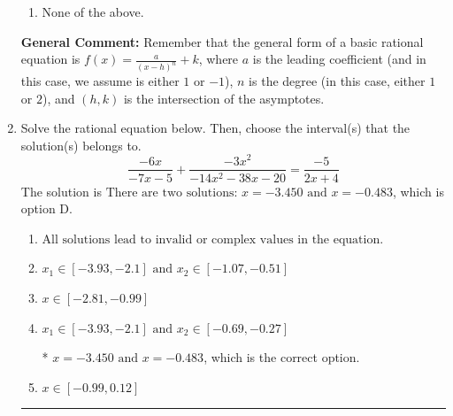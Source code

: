 \documentclass{extbook}[14pt]
\newcommand{\litem}[1]{\item #1

\rule{\textwidth}{0.4pt}}
\begin{document}
\begin{enumerate}
{\begin{enumerate}[label=\Alph*.]
\item None of the above.\end{enumerate}
\textbf{General Comment:} Remember that the general form of a basic rational equation is $ f(x) = \frac{a}{(x-h)^n} + k$, where $a$ is the leading coefficient (and in this case, we assume is either $1$ or $-1$), $n$ is the degree (in this case, either $1$ or $2$), and $(h, k)$ is the intersection of the asymptotes.
}
\litem{
Solve the rational equation below. Then, choose the interval(s) that the solution(s) belongs to.
\[ \frac{-6x}{-7x -5} + \frac{-3x^{2}}{-14x^{2} -38 x -20} = \frac{-5}{2x + 4} \]The solution is \( \text{There are two solutions: } x = -3.450 \text{ and } x = -0.483 \), which is option D.\begin{enumerate}[label=\Alph*.]
\item \( \text{All solutions lead to invalid or complex values in the equation.} \)


\item \( x_1 \in [-3.93, -2.1] \text{ and } x_2 \in [-1.07,-0.51] \)


\item \( x \in [-2.81,-0.99] \)


\item \( x_1 \in [-3.93, -2.1] \text{ and } x_2 \in [-0.69,-0.27] \)

* $x = -3.450 \text{ and } x = -0.483$, which is the correct option.
\item \( x \in [-0.99,0.12] \)


\end{enumerate}

}
\end{enumerate}
\end{document}
